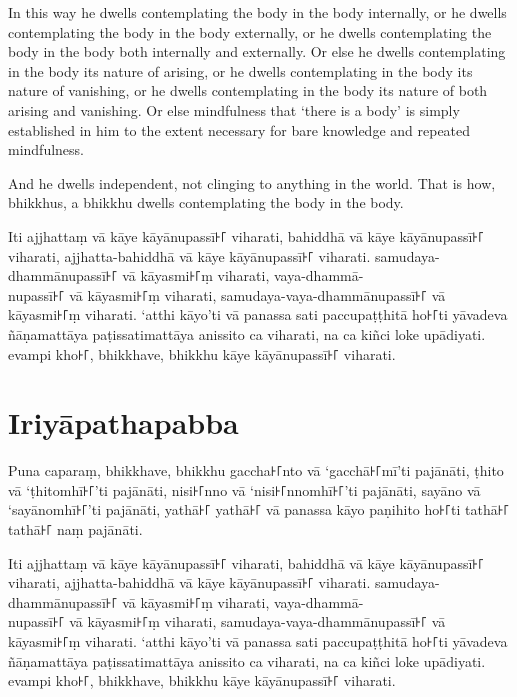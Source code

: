 In this way he dwells contemplating the body in the body internally, or he
dwells contemplating the body in the body externally, or he dwells contemplating
the body in the body both internally and externally. Or else he dwells
contemplating in the body its nature of arising, or he dwells contemplating in
the body its nature of vanishing, or he dwells contemplating in the body its
nature of both arising and vanishing. Or else mindfulness that ‘there is a body’
is simply established in him to the extent necessary for bare knowledge and
repeated mindfulness.

And he dwells independent, not clinging to anything in the world. That is how,
bhikkhus, a bhikkhu dwells contemplating the body in the body.


\paliPage

Iti ajjhattaṃ vā kāye kāyānupassī꜔꜒ viharati, bahiddhā vā kāye kāyānupassī꜔꜒
viharati, ajjhatta-bahiddhā vā kāye kāyānupassī꜔꜒ viharati. samudaya-dhammānupassī꜔꜒
vā kāyasmi꜔꜒ṃ viharati, vaya-dhammā-\\
nupassī꜔꜒ vā kāyasmi꜔꜒ṃ viharati, samudaya-vaya-dhammānupassī꜔꜒ vā kāyasmi꜔꜒ṃ viharati.
‘atthi kāyo’ti vā panassa sati paccupaṭṭhitā ho꜔꜒ti yāvadeva ñāṇamattāya
paṭissatimattāya anissito ca viharati, na ca kiñci loke upādiyati. evampi kho꜔꜒,
bhikkhave, bhikkhu kāye kāyānupassī꜔꜒ viharati.


\section*{Iriyāpathapabba}

Puna caparaṃ, bhikkhave, bhikkhu gaccha꜔꜒nto vā ‘gacchā꜔꜒mī’ti pajānāti, ṭhito vā
‘ṭhitomhī꜔꜒’ti pajānāti, nisi꜔꜒nno vā ‘nisi꜔꜒nnomhī꜔꜒’ti pajānāti, sayāno vā
‘sayānomhī꜔꜒’ti pajānāti, yathā꜔꜒ yathā꜔꜒ vā panassa kāyo paṇihito ho꜔꜒ti tathā꜔꜒ tathā꜔꜒
naṃ pajānāti.

Iti ajjhattaṃ vā kāye kāyānupassī꜔꜒ viharati, bahiddhā vā kāye kāyānupassī꜔꜒
viharati, ajjhatta-bahiddhā vā kāye kāyānupassī꜔꜒ viharati. samudaya-dhammānupassī꜔꜒
vā kāyasmi꜔꜒ṃ viharati, vaya-dhammā-\\
nupassī꜔꜒ vā kāyasmi꜔꜒ṃ viharati, samudaya-vaya-dhammānupassī꜔꜒ vā kāyasmi꜔꜒ṃ viharati.
‘atthi kāyo’ti vā panassa sati paccupaṭṭhitā ho꜔꜒ti yāvadeva ñāṇamattāya
paṭissatimattāya anissito ca viharati, na ca kiñci loke upādiyati. evampi kho꜔꜒,
bhikkhave, bhikkhu kāye kāyānupassī꜔꜒ viharati.

